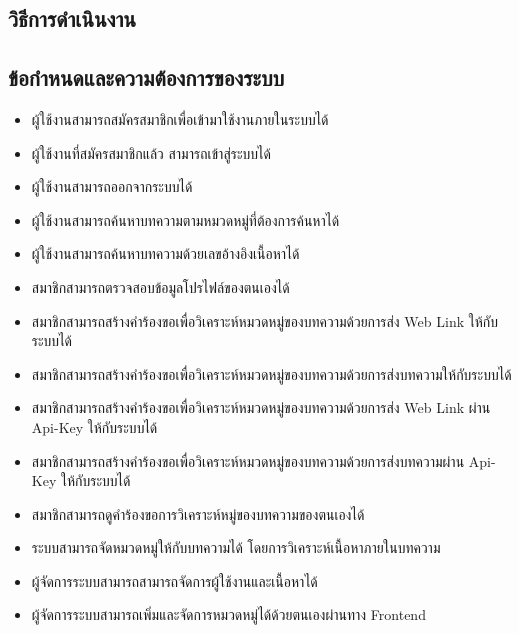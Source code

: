 \documentclass[12pt,oneside,openright,a4paper]{cpe-thai-project}
\begin{document}
\begin{itemize}
 



\chapter{วิธีการดำเนินงาน}

\section{ข้อกำหนดและความต้องการของระบบ}
\begin{itemize}
  \item ผู้ใช้งานสามารถสมัครสมาชิกเพื่อเข้ามาใช้งานภายในระบบได้
  \item ผู้ใช้งานที่สมัครสมาชิกแล้ว สามารถเข้าสู่ระบบได้
  \item ผู้ใช้งานสามารถออกจากระบบได้
  \item ผู้ใช้งานสามารถค้นหาบทความตามหมวดหมู่ที่ต้องการค้นหาได้
  \item ผู้ใช้งานสามารถค้นหาบทความด้วยเลขอ้างอิงเนื้อหาได้
  \item สมาชิกสามารถตรวจสอบข้อมูลโปรไฟล์ของตนเองได้
  \item สมาชิกสามารถสร้างคำร้องขอเพื่อวิเคราะห์หมวดหมู่ของบทความด้วยการส่ง Web Link ให้กับระบบได้
  \item สมาชิกสามารถสร้างคำร้องขอเพื่อวิเคราะห์หมวดหมู่ของบทความด้วยการส่งบทความให้กับระบบได้
  \item สมาชิกสามารถสร้างคำร้องขอเพื่อวิเคราะห์หมวดหมู่ของบทความด้วยการส่ง Web Link ผ่าน Api-Key ให้กับระบบได้
  \item สมาชิกสามารถสร้างคำร้องขอเพื่อวิเคราะห์หมวดหมู่ของบทความด้วยการส่งบทความผ่าน Api-Key ให้กับระบบได้
  \item สมาชิกสามารถดูคำร้องขอการวิเคราะห์หมู่ของบทความของตนเองได้
  \item ระบบสามารถจัดหมวดหมู่ให้กับบทความได้ โดยการวิเคราะห์เนื้อหาภายในบทความ 
  \item ผู้จัดการระบบสามารถสามารถจัดการผู้ใช้งานและเนื้อหาได้
  \item ผู้จัดการระบบสามารถเพิ่มและจัดการหมวดหมู่ได้ด้วยตนเองผ่านทาง Frontend
\end{itemize}


\end{itemize}
\end{document}
